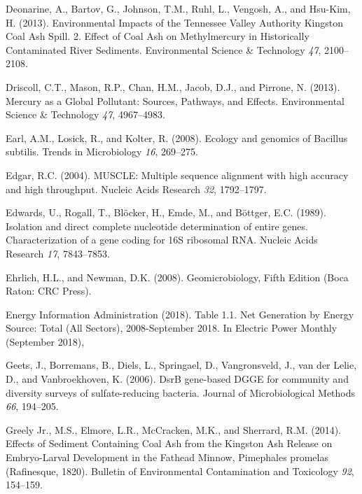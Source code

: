 \documentclass[ms, hidelinks]{uncgdissertationexp}
\theoremstyle{plain}
\theoremstyle{definition}
\theoremstyle{remark}
\begin{document}
\leavevmode\hypertarget{ref-deonarineEnvironmentalImpactsTennessee2013}{}%
Deonarine, A., Bartov, G., Johnson, T.M., Ruhl, L., Vengosh, A., and Hsu-Kim, H. (2013). Environmental Impacts of the Tennessee Valley Authority Kingston Coal Ash Spill. 2. Effect of Coal Ash on Methylmercury in Historically Contaminated River Sediments. Environmental Science \& Technology \emph{47}, 2100--2108.

\leavevmode\hypertarget{ref-driscollMercuryGlobalPollutant2013}{}%
Driscoll, C.T., Mason, R.P., Chan, H.M., Jacob, D.J., and Pirrone, N. (2013). Mercury as a Global Pollutant: Sources, Pathways, and Effects. Environmental Science \& Technology \emph{47}, 4967--4983.

\leavevmode\hypertarget{ref-earlEcologyGenomicsBacillus2008}{}%
Earl, A.M., Losick, R., and Kolter, R. (2008). Ecology and genomics of Bacillus subtilis. Trends in Microbiology \emph{16}, 269--275.

\leavevmode\hypertarget{ref-edgarMUSCLEMultipleSequence2004}{}%
Edgar, R.C. (2004). MUSCLE: Multiple sequence alignment with high accuracy and high throughput. Nucleic Acids Research \emph{32}, 1792--1797.

\leavevmode\hypertarget{ref-edwardsIsolationDirectComplete1989}{}%
Edwards, U., Rogall, T., Blöcker, H., Emde, M., and Böttger, E.C. (1989). Isolation and direct complete nucleotide determination of entire genes. Characterization of a gene coding for 16S ribosomal RNA. Nucleic Acids Research \emph{17}, 7843--7853.

\leavevmode\hypertarget{ref-ehrlichGeomicrobiologyFifthEdition2008}{}%
Ehrlich, H.L., and Newman, D.K. (2008). Geomicrobiology, Fifth Edition (Boca Raton: CRC Press).

\leavevmode\hypertarget{ref-energyinformationadministrationTableNetGeneration2018}{}%
Energy Information Administration (2018). Table 1.1. Net Generation by Energy Source: Total (All Sectors), 2008-September 2018. In Electric Power Monthly (September 2018),

\leavevmode\hypertarget{ref-geetsDsrBGenebasedDGGE2006}{}%
Geets, J., Borremans, B., Diels, L., Springael, D., Vangronsveld, J., van der Lelie, D., and Vanbroekhoven, K. (2006). DsrB gene-based DGGE for community and diversity surveys of sulfate-reducing bacteria. Journal of Microbiological Methods \emph{66}, 194--205.

\leavevmode\hypertarget{ref-greelyjr.EffectsSedimentContaining2014}{}%
Greely Jr., M.S., Elmore, L.R., McCracken, M.K., and Sherrard, R.M. (2014). Effects of Sediment Containing Coal Ash from the Kingston Ash Release on Embryo-Larval Development in the Fathead Minnow, Pimephales promelas (Rafinesque, 1820). Bulletin of Environmental Contamination and Toxicology \emph{92}, 154--159.
\end{document}
